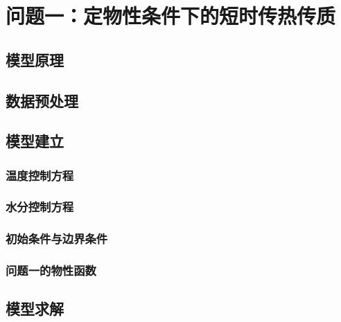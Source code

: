 \documentclass[withoutpreface,bwprint]{cumcmthesis}
\begin{document}
\section{问题一：定物性条件下的短时传热传质}







\subsection{模型原理}


\subsection{数据预处理}





\subsection{模型建立}

\subsubsection{温度控制方程}
\subsubsection{水分控制方程}
\subsubsection{初始条件与边界条件}
\subsubsection{问题一的物性函数}















\subsection{模型求解}
\end{document}
